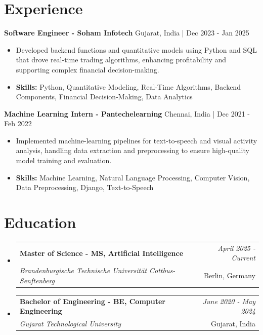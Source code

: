 \documentclass[a4paper,11pt]{article}
\makeatletter
\newcommand{\resumeSubheading}[4]{
\vspace{0.5mm}\item
    \begin{tabular*}{\linewidth}[t]{l@{\extracolsep{\fill}}r}
        \textbf{#1} & \textit{\footnotesize{#4}} \\
        \textit{\footnotesize{#3}} &  \footnotesize{#2}\\
    \end{tabular*}
    \vspace{-2.4mm}
}
\makeatother
\begin{document}
\section{\textbf{Experience}}


\vspace{1mm}
  \textbf{Software Engineer - Soham Infotech} \hfill Gujarat, India | Dec 2023 - Jan 2025
\vspace{-1.5mm} %
\begin{itemize}
  \item Developed backend functions and quantitative models using Python and SQL that drove real-time trading algorithms, enhancing profitability and supporting complex financial decision-making.

\vspace{-2mm}
  \item \textbf{Skills:} Python, Quantitative Modeling, Real-Time Algorithms, Backend Components, Financial Decision-Making, Data Analytics
\end{itemize}

\vspace{1mm}
  \textbf{Machine Learning Intern - Pantechelearning} \hfill Chennai, India | Dec 2021 - Feb 2022
\vspace{-1.5mm} %
\begin{itemize}
  \item Implemented machine-learning pipelines for text-to-speech and visual activity analysis, handling data extraction and preprocessing to ensure high-quality model training and evaluation.
\vspace{-2mm}
  \item \textbf{Skills:} Machine Learning, Natural Language Processing, Computer Vision, Data Preprocessing, Django, Text-to-Speech
\end{itemize}\section{\textbf{Education}}
\vspace{-0.4mm}

\begin{itemize}[leftmargin=0.15in, label={}]
\resumeSubheading
{Master of Science - MS, Artificial Intelligence }{Berlin, Germany}
{Brandenburgische Technische Universität Cottbus-Senftenberg  }{April 2025 - Current}

\vspace{1.0mm} %
\resumeSubheading
{Bachelor of Engineering - BE, Computer Engineering  }{Gujarat, India}
{Gujarat Technological University }{June 2020 - May 2024}

\end{itemize}
\end{document}
